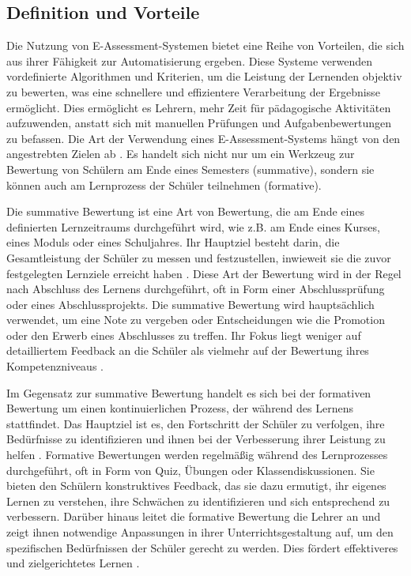 \subsection{Definition und Vorteile}

Die Nutzung von E-Assessment-Systemen bietet eine Reihe von Vorteilen, die sich aus ihrer Fähigkeit zur Automatisierung ergeben. Diese Systeme verwenden vordefinierte Algorithmen und Kriterien, um die Leistung der Lernenden objektiv zu bewerten, was eine schnellere und effizientere Verarbeitung der Ergebnisse ermöglicht. Dies ermöglicht es Lehrern, mehr Zeit für pädagogische Aktivitäten aufzuwenden, anstatt sich mit manuellen Prüfungen und Aufgabenbewertungen zu befassen. Die Art der Verwendung eines E-Assessment-Systems hängt von den angestrebten Zielen ab \cite{review-e}. Es handelt sich nicht nur um ein Werkzeug zur Bewertung von Schülern am Ende eines Semesters (summative), sondern sie können auch am Lernprozess der Schüler teilnehmen (formative).

Die \gls{summative Bewertung} ist eine Art von Bewertung, die am Ende eines definierten Lernzeitraums durchgeführt wird, wie z.B. am Ende eines Kurses, eines Moduls oder eines Schuljahres. Ihr Hauptziel besteht darin, die Gesamtleistung der Schüler zu messen und festzustellen, inwieweit sie die zuvor festgelegten Lernziele erreicht haben \cite{review-e}. Diese Art der Bewertung wird in der Regel nach Abschluss des Lernens durchgeführt, oft in Form einer Abschlussprüfung oder eines Abschlussprojekts. Die summative Bewertung wird hauptsächlich verwendet, um eine Note zu vergeben oder Entscheidungen wie die Promotion oder den Erwerb eines Abschlusses zu treffen. Ihr Fokus liegt weniger auf detailliertem Feedback an die Schüler als vielmehr auf der Bewertung ihres Kompetenzniveaus \cite{review-e}.

Im Gegensatz zur summative Bewertung handelt es sich bei der formativen Bewertung um einen kontinuierlichen Prozess, der während des Lernens stattfindet. Das Hauptziel ist es, den Fortschritt der Schüler zu verfolgen, ihre Bedürfnisse zu identifizieren und ihnen bei der Verbesserung ihrer Leistung zu helfen \cite{gruttmann2009formatives}. Formative Bewertungen werden regelmäßig während des Lernprozesses durchgeführt, oft in Form von Quiz, Übungen oder Klassendiskussionen. Sie bieten den Schülern konstruktives Feedback, das sie dazu ermutigt, ihr eigenes Lernen zu verstehen, ihre Schwächen zu identifizieren und sich entsprechend zu verbessern. Darüber hinaus leitet die \gls{formative Bewertung} die Lehrer an und zeigt ihnen notwendige Anpassungen in ihrer Unterrichtsgestaltung auf, um den spezifischen Bedürfnissen der Schüler gerecht zu werden. Dies fördert effektiveres und zielgerichtetes Lernen \cite{gruttmann2009formatives}.

